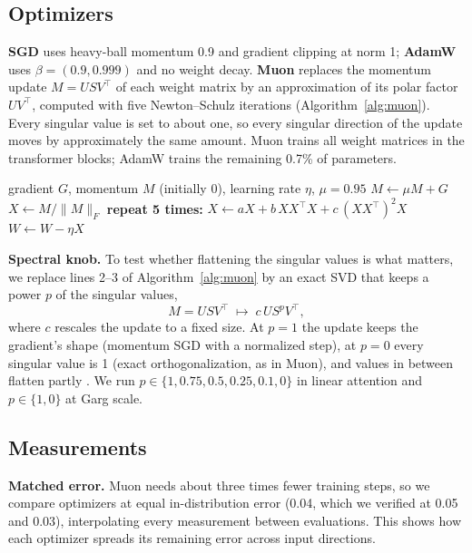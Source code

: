 \documentclass{article}
\begin{document}
\subsection{Optimizers}
\textbf{SGD} uses heavy-ball momentum 0.9 and gradient clipping at norm 1; \textbf{AdamW} \citep{kingma2015adam,loshchilov2019} uses $\beta = (0.9, 0.999)$ and no weight decay. \textbf{Muon} \citep{jordan2024muon} replaces the momentum update $M = USV^\top$ of each weight matrix by an approximation of its polar factor $UV^\top$, computed with five Newton--Schulz iterations (Algorithm~\ref{alg:muon}). Every singular value is set to about one, so every singular direction of the update moves by approximately the same amount. Muon trains all weight matrices in the transformer blocks; AdamW trains the remaining 0.7\% of parameters.

\begin{algorithm}[t]
\caption{Muon update for one weight matrix $W$ (Nesterov momentum and shape scaling as in \citet{jordan2024muon} omitted)}
\label{alg:muon}
\begin{algorithmic}[1]
\Require gradient $G$, momentum $M$ (initially 0), learning rate $\eta$, $\mu = 0.95$
\State $M \gets \mu M + G$ 
\State $X \gets M / \|M\|_F$
\State \textbf{repeat 5 times:} $X \gets aX + b\,XX^\top X + c\,(XX^\top)^2 X$ 
\State $W \gets W - \eta X$
\end{algorithmic}
\end{algorithm}

\textbf{Spectral knob.} To test whether flattening the singular values is what matters, we replace lines 2--3 of Algorithm~\ref{alg:muon} by an exact SVD that keeps a power $p$ of the singular values,
\begin{equation}
M = U S V^\top \;\longmapsto\; c\, U S^{p} V^\top ,
\label{eq:knob}
\end{equation}
where $c$ rescales the update to a fixed size. At $p = 1$ the update keeps the gradient's shape (momentum SGD with a normalized step), at $p = 0$ every singular value is 1 (exact orthogonalization, as in Muon), and values in between flatten partly \citep{dong2026muonp}. We run $p \in \{1, 0.75, 0.5, 0.25, 0.1, 0\}$ in linear attention and $p \in \{1, 0\}$ at Garg scale.

\subsection{Measurements}
\label{sec:measure}
\textbf{Matched error.} Muon needs about three times fewer training steps, so we compare optimizers at equal in-distribution error (0.04, which we verified at 0.05 and 0.03), interpolating every measurement between evaluations. This shows how each optimizer spreads its remaining error across input directions.
\end{document}
